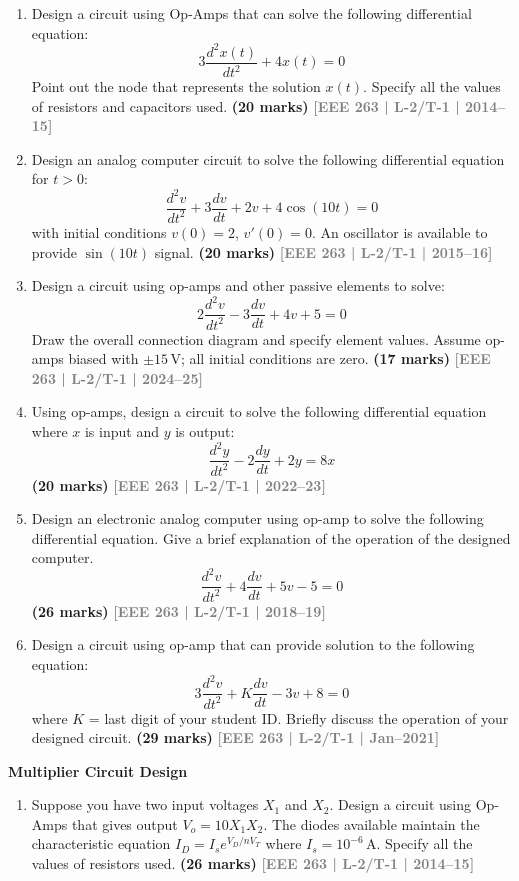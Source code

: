 \documentclass[12pt,a4paper]{article}
\newcommand{\yr}[1]{\hfill\textcolor{gray}{\small\textbf{[#1]}}}
\newcommand{\mk}[1]{\textcolor{orange!70!black}{\small\textbf{(#1 marks)}}}
\newcommand{\subtopic}[2]{%
  \vspace{10pt}
  \noindent\begin{tcolorbox}[colback=#1!8,colframe=#1,boxrule=0.6pt,arc=4pt,
    left=6pt,right=6pt,top=4pt,bottom=4pt]
    \small\bfseries\textcolor{#1}{#2}
  \end{tcolorbox}
  \vspace{2pt}
}
\begin{document}
\begin{enumerate}

\item Design a circuit using Op-Amps that can solve the following differential equation:
\[
3\frac{d^2x(t)}{dt^2} + 4x(t) = 0
\]
Point out the node that represents the solution $x(t)$. Specify all the values of resistors and capacitors used.
\mk{20} \yr{EEE 263 | L-2/T-1 | 2014--15}

\item Design an analog computer circuit to solve the following differential equation for $t>0$:
\[
\frac{d^2v}{dt^2} + 3\frac{dv}{dt} + 2v + 4\cos(10t) = 0
\]
with initial conditions $v(0)=2$, $v'(0)=0$. An oscillator is available to provide $\sin(10t)$ signal.
\mk{20} \yr{EEE 263 | L-2/T-1 | 2015--16}

\item Design a circuit using op-amps and other passive elements to solve:
\[
2\frac{d^2v}{dt^2} - 3\frac{dv}{dt} + 4v + 5 = 0
\]
Draw the overall connection diagram and specify element values. Assume op-amps biased with $\pm15\,\text{V}$; all initial conditions are zero.
\mk{17} \yr{EEE 263 | L-2/T-1 | 2024--25}

\item Using op-amps, design a circuit to solve the following differential equation where $x$ is input and $y$ is output:
\[
\frac{d^2y}{dt^2} - 2\frac{dy}{dt} + 2y = 8x
\]
\mk{20} \yr{EEE 263 | L-2/T-1 | 2022--23}

\item Design an electronic analog computer using op-amp to solve the following differential equation. Give a brief explanation of the operation of the designed computer.
\[
\frac{d^2v}{dt^2} + 4\frac{dv}{dt} + 5v - 5 = 0
\]
\mk{26} \yr{EEE 263 | L-2/T-1 | 2018--19}

\item Design a circuit using op-amp that can provide solution to the following equation:
\[
3\frac{d^2v}{dt^2} + K\frac{dv}{dt} - 3v + 8 = 0
\]
where $K$ = last digit of your student ID. Briefly discuss the operation of your designed circuit.
\mk{29} \yr{EEE 263 | L-2/T-1 | Jan--2021}

\end{enumerate}

\subtopic{cE}{Multiplier Circuit Design}
\label{sub:s7-mult}

\begin{enumerate}

\item Suppose you have two input voltages $X_1$ and $X_2$. Design a circuit using Op-Amps that gives output $V_o = 10X_1 X_2$. The diodes available maintain the characteristic equation $I_D = I_s e^{V_D/nV_T}$ where $I_s = 10^{-6}\,\text{A}$. Specify all the values of resistors used.
\mk{26} \yr{EEE 263 | L-2/T-1 | 2014--15}

\end{enumerate}
\end{document}
